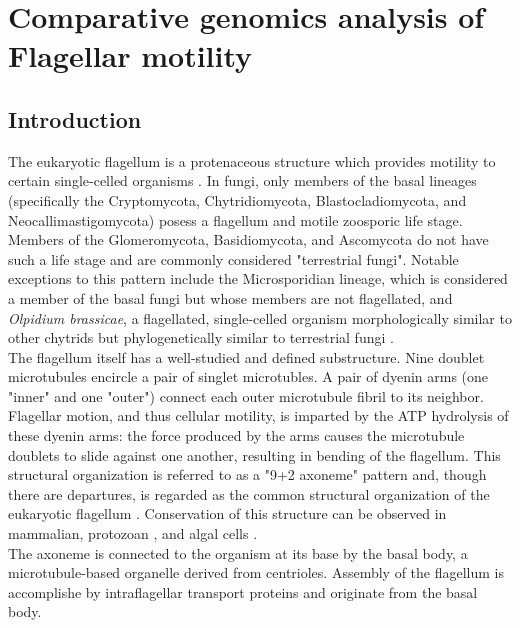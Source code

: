 \chapter{Comparative genomics analysis of Flagellar motility}
\label{app:Flagella}
\section{Introduction}
The eukaryotic flagellum is a protenaceous structure which provides motility to certain single-celled organisms \cite{Haimo1981}. In fungi, only members of the basal lineages (specifically the Cryptomycota, Chytridiomycota, Blastocladiomycota, and Neocallimastigomycota) posess a flagellum and motile zoosporic life stage. Members of the Glomeromycota, Basidiomycota, and Ascomycota do not have such a life stage \cite{Stajich2009} and are commonly considered "terrestrial fungi". Notable exceptions to this pattern include the Microsporidian lineage, which is considered a member of the basal fungi but whose members are not flagellated, and \textit{Olpidium brassicae}, a flagellated, single-celled organism morphologically similar to other chytrids but phylogenetically similar to terrestrial fungi \cite{Sekimoto2011}. \\
\indent The flagellum itself has a well-studied and defined substructure. Nine doublet microtubules encircle a pair of singlet microtubles. A pair of dyenin arms (one "inner" and one "outer") connect each outer microtubule fibril to its neighbor. Flagellar motion, and thus cellular motility, is imparted by the ATP hydrolysis of these dyenin arms: the force produced by the arms causes the microtubule doublets to slide against one another, resulting in bending of the flagellum. This structural organization is referred to as a "9+2 axoneme" pattern and, though there are departures, is regarded as the common structural organization of the eukaryotic flagellum \cite{Haimo1981}. Conservation of this structure can be observed in mammalian, protozoan \cite{Inaba2003}, and algal cells \cite{Silflow2001}.\\
\indent The axoneme is connected to the organism at its base by the basal body, a microtubule-based organelle derived from centrioles. Assembly of the flagellum is accomplishe by intraflagellar transport proteins and originate from the basal body.\\
